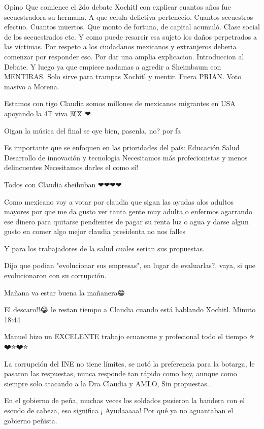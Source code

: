 Opino Que comience el 2do debate  Xochitl  con explicar cuantos años fue secuestradora su hermana. A que celula delictiva pertenecio. Cuantos secuestros efectuo. Cuantos muertos. Que monto de fortuna, de capital acumuló.  Clase social de los secuestrados etc. Y como puede resarcir  esa sujeto los daños perpetrados a las víctimas. Por respeto a los ciudadanos mexicanos y extranjeros deberia comenzar por responder eso. Por dar una  amplia explicacion. Introduccion al Debate. Y luego ya que empiece nadamas a agredir a Sheimbaum con MENTIRAS. Solo sirve para trampas Xochitl y mentir. Fuera PRIAN. Voto masivo a Morena.

Estamos con tigo Claudia somos millones de mexicanos migrantes en USA apoyando la 4T viva 🇲🇽 ❤

Oigan la música del final se oye bien, pasenla, no? por fa

Es importante que se enfoquen en  las prioridades del país:
Educación 
Salud
Desarrollo de innovación y tecnología 
Necesitamos más profecionistas y menos delincuentes 
Necesitamos darles el como sí!

Todos con Claudia sheihuban ❤❤❤❤🎉🎉🎉🎉🎉

Como mexicano voy a votar por claudia que sigan las ayudas alos adultos mayores por que me da gusto ver tanta gente muy adulta o enfermos agarrando ese dinero para quitarse pendientes de pagar su renta luz o agua y darse algun gusto en comer algo mejor claudia presidenta no nos falles

Y para los trabajadores de la salud cuales serian sus propuestas.

Dijo que podian "evolucionar sus empresas", en lugar de evaluarlas?, vaya, si que evolucionaron con su corrupción.

Mañana va estar buena la mañanera😁

El descaro!!😂 le restan tiempo a Claudia cuando está hablando Xochitl.  Minuto 18:44

Manuel hizo un EXCELENTE trabajo ecuanome y profecional todo el tiempo
⭐️❤️⭐️❤️⭐️

La corrupción del INE no tiene límites, se notó la preferencia para la botarga, le pasaron las respuestas, nunca responde tan rápido como hoy, aunque como siempre solo atacando a la Dra Claudia y AMLO, Sin propuestas...

En el gobierno de peña, muchas veces los soldados pusieron la bandera con el escudo de cabeza, eso significa ¡ Ayudaaaaa! Por qué ya no aguantaban el gobierno peñista.

